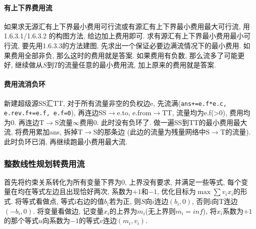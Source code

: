 \paragraph{有上下界费用流}
如果求无源汇有上下界最小费用可行流或有源汇有上下界最小费用最大可行流, 用1.6.3.1/1.6.3.2 的构图方法, 给边加上费用即可. 
求有源汇有上下界最小费用最小可行流, 要先用1.6.3.3的方法建图, 先求出一个保证必要边满流情况下的最小费用. 如果费用全部非负, 那么这时的费用就是答案. 如果费用有负数, 那么流多了可能更好, 继续做从$S$到$T$的流量任意的最小费用流, 加上原来的费用就是答案. 
\paragraph{费用流消负环}
新建超级源SS汇TT, 对于所有流量非空的负权边e, 先流满(\texttt{ans+=e.f*e.c, e.rev.f+=e.f, e.f=0}), 再连边SS$\to$e.to, e.from$\to$TT, 流量均为e.f(>0), 费用均为0. 再连边T$\to$S流量$\infty$费用0. 此时没有负环了. 做一遍SS到TT的最小费用最大流, 将费用累加ans, 拆掉T$\to$S的那条边 (此边的流量为残量网络中S$\to$T的流量). 此时负环已消, 再继续跑最小费用最大流.

\subsubsection*{整数线性规划转费用流}
\noindent
首先将约束关系转化为所有变量下界为$0$, 上界没有要求, 并满足一些等式,
每个变量在均在等式左边且出现恰好两次, 系数为$+1$和$-1$, 优化目标为$\max\sum v_ix_i$的形式.
将等式看做点, 等式i右边的值$b_i$若为正, 则$S$向$i$连边$(b_i, 0)$, 否则i向T连边$(-b_i, 0)$.
将变量看做边, 记变量$x_i$的上界为$m_i$(无上界则$m_i=inf$), 将$x_i$系数为$+1$的那个等式$u$向系数为$-1$的等式$v$连边$(m_i, v_i)$.